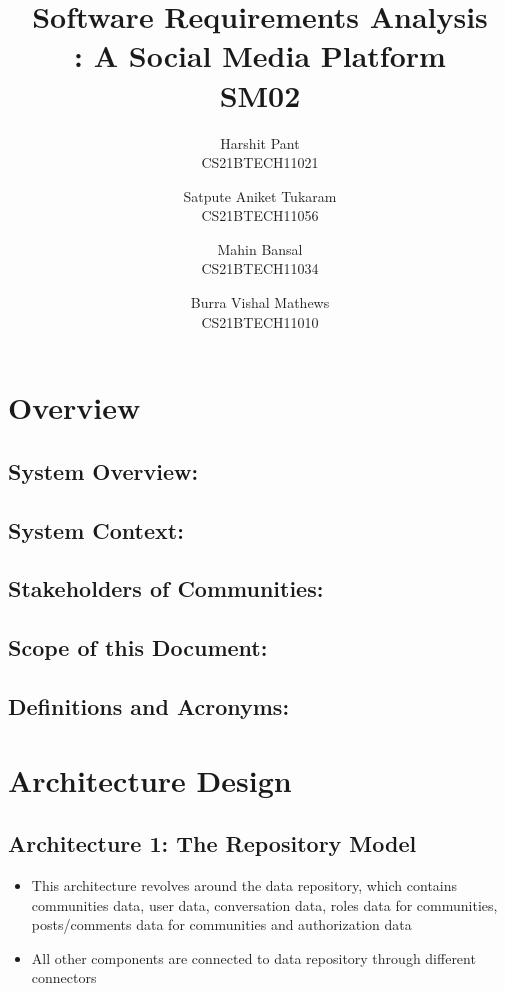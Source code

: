 \documentclass[11pt]{article}
\title{Software Requirements Analysis\\\Name : A Social Media Platform\\ SM02}
\author{Harshit Pant \\ CS21BTECH11021 \and Satpute Aniket Tukaram \\ CS21BTECH11056 \and Mahin Bansal \\ CS21BTECH11034 \and Burra Vishal Mathews \\ CS21BTECH11010}
\date{}
\begin{document}
\maketitle
\section{Overview}

\subsection{System Overview:}

\subsection{System Context:}

\subsection{Stakeholders of Communities:}

\subsection{Scope of this Document:}

\subsection{Definitions and Acronyms:}


\section{ Architecture Design}

\subsection{Architecture 1: The Repository Model}

\begin{itemize}
    \item This architecture revolves around the data repository, which contains communities data, user data, conversation data, roles data for communities, posts/comments data for communities and authorization data
    \item All other components are connected to data repository through different connectors
\end{itemize}
\end{document}
